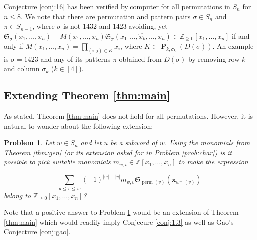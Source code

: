 \documentclass{amsart}
\newtheorem{problem}[theorem]{Problem}
\theoremstyle{definition}
\theoremstyle{named}
\def\Z{\mathbb{Z}}
\newcommand*{\Schub}{\mathfrak{S}}
\DeclareMathOperator*{\Purple}{\mathbf{P}}
\DeclareMathOperator*{\perm}{perm}
\begin{document}
Conjecture \ref{conj:16} has been verified by computer for all permutations in $S_n$ for $n\leq 8$.
We note that there are permutation and pattern pairs $\sigma \in S_n$ and $\pi \in S_{n-1}$, where $\sigma$ is not $1432$ and $1423$ avoiding, yet $\mathfrak{S}_{\sigma}(x_1, \ldots, x_n)-M(x_1, \ldots, x_n) \mathfrak{S}_{\pi}(x_{1}, \ldots, \widehat{x_k}, \ldots, x_{n}) \in \mathbb{Z}_{\geq 0}[x_1, \ldots, x_n]$ if and only if $M(x_1, \dots, x_n) = \prod_{(i, j) \in K} x_i$, where $K \in \Purple_{k, \sigma_k}(D(\sigma))$. An example is $\sigma=1423$ and any of its patterns $\pi$ obtained from $D(\sigma)$ by removing row $k$ and column $\sigma_k$ ($k \in [4]$).%


	\subsection{Extending Theorem \ref{thm:main}} As stated, Theorem \ref{thm:main} does not hold for  all permutations. However, it is natural to wonder about the following extension:

	 \begin{problem} \label{prob:gen}  Let $w \in S_n$ and let $u$ be a subword of $w$. Using the monomials from Theorem \ref{thm:gen} (or its extension asked for in Problem \ref{prob:char}) is it possible to pick suitable monomials $m_{w,v} \in \Z[x_1, \ldots, x_n]$ to make the expression

	$$\sum_{u \le v \le w} (-1)^{\left|w\right|-\left|v\right|} m_{w, v} \Schub_{\perm(v)}(\mathbf{x}_{w^{-1}(v)})$$ belong to $\Z_{\ge0}[x_1, \dots, x_n]$?
 	  \end{problem}

	Note that a positive answer to Problem \ref{prob:gen} would be an extension of Theorem \ref{thm:main} which would readily imply Conjecure \ref{conj:1.3} as well as Gao's Conjecture \ref{conj:gao}.

	
	
\end{document}
